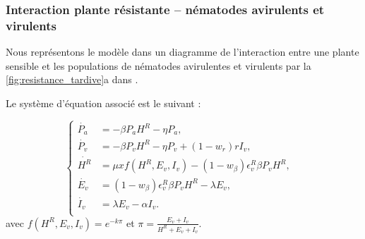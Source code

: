 \subsubsection{Interaction plante résistante -- nématodes avirulents et virulents} \label{sec:model-resistance-precoce}
	
	Nous représentons le modèle dans un diagramme de l'interaction entre une plante sensible et les populations de nématodes avirulentes et virulents  par la \autoref{fig:resistance_tardive}a dans .
		
		\iffalse
\begin{figure}[H] 
	\centering \texttt{[image: mod\_planteR.pdf]}
		\caption[Modèle  de résistance précoce]{Ce diagramme représente la dynamique d’infection sur une plante saine $H^R$
		par des nématodes virulents $P_v$,   avant   
		de devenir infectée de manière latente $E_v$ ensuite infectieuse
		$I_v$ quand les nématodes virulents  pondent par
		reproduction asexuée ou clonale. Les nématodes avirulents
		$P_a$ sont incapables d'infecter et de se reproduire sur
		la plante résistante $(\epsilon_a^R=0)$. $\beta$ correspond au
		taux d’infection entre les plantes et
		les nématodes ; $\lambda$ désigne le taux de passage 
		du compartiment $E_v$ à $I_v$ ; $r$ désigne le taux
		de reproduction des nématodes ; $\eta$ est le taux de mortalité des nématodes dans le sol et
		$alpha$ le taux de mortalité des nématodes dans la plante.
		Il faut noter que les nématodes virulents souffrent de coûts de virulence, à deux niveaux : une baisse sur 
		l'infection $(w_\beta)$ 
		et une autre sur la  reproduction $(w_r)$. 
		}
		\label{fig:planteR-nemavir-vir}
\end{figure}
		\fi
	
Le système d'équation associé est le suivant :

\begin{equation}
	 \left\{
		\begin{aligned}
		\dot{P_a} & =- \beta P_aH^R -\eta P_a ,&\\
		\dot{P_v} & =-\beta P_vH^R -\eta P_v  +(1-w_{r})r I_v,&\\
		\dot{H^R} &= \mu x f(H^R,E_v,I_v) -(1-w_{\beta}) \epsilon_v^R \beta P_v H^R,& \\
		\dot{E_v} &=  (1-w_{\beta}) \epsilon_v^R \beta P_v H^R  - \lambda E_v, &\\
		\dot{I_v} & = \lambda E_v -\alpha I_v .&\\
		\end{aligned}
	\right.
\label{eq:ResistanceP-nemavir-nemvir}
\end{equation}
avec $f(H^R,E_v,I_v)= e^{-k \pi}$ et $ \pi= \frac{E_v+I_v }{H^R+E_v+I_v}$.
	
